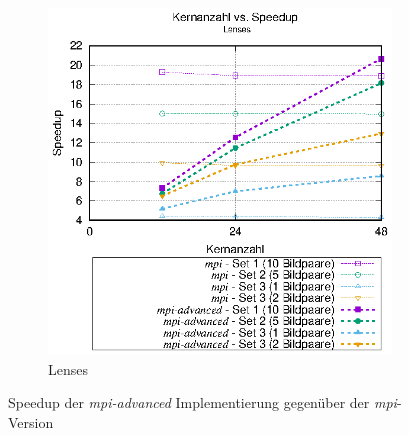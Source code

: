 \begin{center}
\begin{figure}[htbp]
\begin{subfigure}[b]{0.45\textwidth}
			\includegraphics[width=\textwidth]{pdf/mpi_advanced_speedup_lenses}
			\caption{Lenses}
			\label{fig:mpi_advanced_speedup_lenses}
		\end{subfigure}
		\caption{Speedup der \textit{mpi-advanced} Implementierung gegenüber der \textit{mpi}-Version}
		\label{fig:mpi_advanced_speedup}
	\end{figure}
\end{center}

